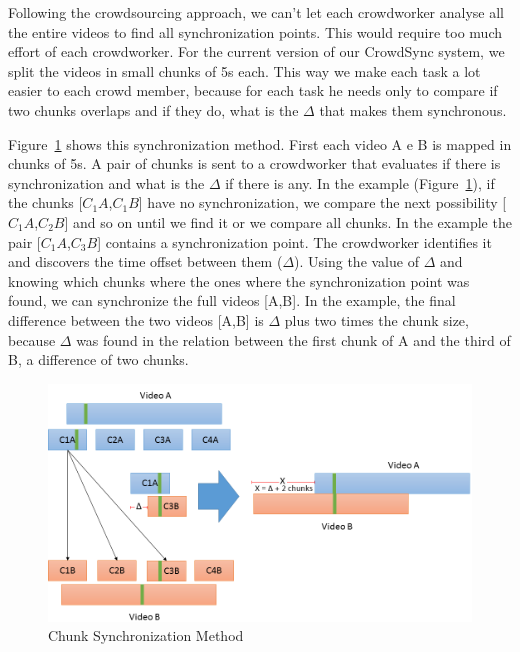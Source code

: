 \label{chunk-sync}
Following the crowdsourcing approach, we can't let each crowdworker analyse all the entire videos to find all synchronization points. This would require too much effort of each crowdworker. For the current version of our CrowdSync system, we split the videos in small chunks of 5s each. This way we make each task a lot easier to each crowd member, because for each task he needs only to compare if two chunks overlaps and if they do, what is the $\Delta$ that makes them synchronous.

Figure~\ref{chunks_process} shows this synchronization method. First each video A e B is mapped in chunks of 5s. A pair of chunks is sent to a crowdworker that evaluates if there is synchronization and what is the $\Delta$ if there is any. In the example (Figure~\ref{chunks_process}), if the chunks [$C_{1}A$,$C_{1}B$] have no synchronization, we compare the next possibility [$C_{1}A$,$C_{2}B$] and so on until we find it or we compare all chunks. In the example the pair [$C_{1}A$,$C_{3}B$] contains a synchronization point. The crowdworker identifies it and discovers the time offset between them ($\Delta$). Using the value of $\Delta$ and knowing which chunks where the ones where the synchronization point was found, we can synchronize the full videos [A,B]. In the example, the final difference between the two videos [A,B] is $\Delta$ plus two times the chunk size, because $\Delta$ was found in the relation between the first chunk of A and the third of B, a difference of two chunks.

\begin{figure}[h]
	\centerline{\includegraphics[scale=0.35] {figure/chunks}}
	\caption{Chunk Synchronization Method}
	\label{chunks_process}
\end{figure}

